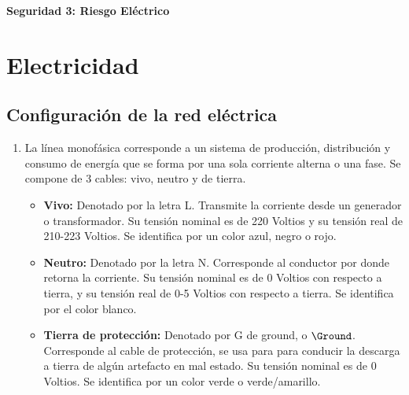 \begin{titlepage}
   \begin{center}
       \vspace*{9cm}
       \LARGE
       \textbf{Seguridad 3: Riesgo Eléctrico}
       \vspace{0.8cm}
   \end{center}
\end{titlepage}

\section{Electricidad}
\subsection{Configuración de la red eléctrica}
\begin{enumerate}
    \item %
La línea monofásica corresponde a un sistema de producción, distribución y consumo de energía que se forma por una sola corriente alterna o una fase. Se compone  de 3 cables: vivo, neutro y de tierra.
\begin{itemize}
    \item \textbf{Vivo:} Denotado por la letra L. Transmite la corriente desde un generador o transformador. Su tensión nominal es de 220 Voltios y su tensión real de 210-223 Voltios. Se identifica por un color azul, negro o rojo. 
    
    \item \textbf{Neutro:} Denotado por la letra N. Corresponde al conductor por donde retorna la corriente. Su tensión nominal es de 0 Voltios con respecto a tierra, y su tensión real de 0-5 Voltios con respecto a tierra. Se identifica por el color blanco.
    
\item \textbf{Tierra de protección:} Denotado por G de ground, o $\Ground$. Corresponde al cable de protección, se usa para para conducir la descarga a tierra de algún artefacto en mal estado. Su tensión nominal es de 0 Voltios. Se identifica por un color verde o verde/amarillo. 
\end{itemize}


\end{enumerate}
